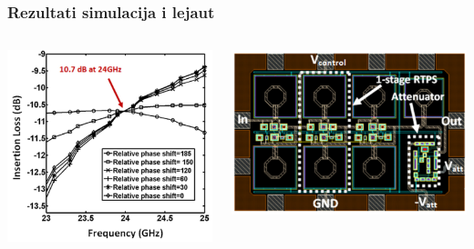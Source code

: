 \documentclass{beamer}
\begin{document}
\begin{frame}
\frametitle{Rezultati simulacija i lejaut}
\begin{columns}
  \begin{column}{0.5\textwidth}
    \includegraphics[width=\textwidth]{insertion_loss_variation.png}
  \end{column}
  \begin{column}{0.5\textwidth}
    \includegraphics[width=\textwidth]{rtps_layout.png}
  \end{column}
\end{columns}
\end{frame}
\end{document}
